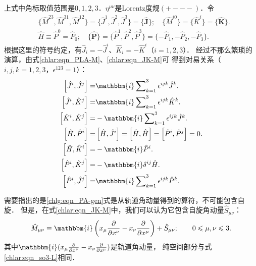 上式中角标取值范围是$0,1,2,3$．$\eta^{\mu \nu}$是Lorentz度规$(+---)$．令
\begin{equation}\label{chlar:eqn_JK-M}
	\begin{aligned}
		&\{\hat{M}^{23},\hat{M}^{31},\hat{M}^{12}\}= \{\hat{J}^1, \hat{J}^2, \hat{J}^3\}=\{\hat{\boldsymbol{J}}\};
		\quad \{\hat{M}^{i0}\}= \{\hat{K}^i\}=\{\hat{\boldsymbol{K}}\}. \\
		& \hat{H}\equiv \hat{P}^0 = \hat{P}_0;\quad 
		\{\hat{\boldsymbol{P}}\}=\{\hat{P}^1,\hat{P}^2,\hat{P}^3\} =\{-\hat{P}_1,-\hat{P}_2,-\hat{P}_3\}.
	\end{aligned}
\end{equation}
根据这里的符号约定，有$\hat{J}_i=-\hat{J}^i$、$\hat{K}_i=-\hat{K}^i$（$i=1,2,3$）．
经过不那么繁琐的演算，由式\eqref{chlar:eqn_PLA-M}、\eqref{chlar:eqn_JK-M}可
得到对易关系（$i,j,k=1,2,3$，$\epsilon^{123}=1$）：
\begin{subequations}\label{chlar:eqn_PA-iso13-comm-PJK}
	\begin{align}
		\left[\hat{J}^i, \hat{J}^j \right] =& \mathbbm{i} \sum\nolimits_{k=1}^{3} \epsilon^{ijk} \hat{J}^k . \\
		\left[\hat{J}^i, \hat{K}^j\right] =& \mathbbm{i} \sum\nolimits_{k=1}^{3} \epsilon^{ijk} \hat{K}^k . \\
		\left[\hat{K}^i, \hat{K}^j\right] =& -\mathbbm{i}\sum\nolimits_{k=1}^{3} \epsilon^{ijk} \hat{J}^k . \\
		\left[\hat{H}, \hat{P}^i \right] =& \left[\hat{H}, \hat{J}^i \right]
		=\left[\hat{H}, \hat{H} \right] =\left[\hat{P}^i, \hat{P}^j \right] =0 . \\
		\left[\hat{H}, \hat{K}^i \right] = & -\mathbbm{i} \hat{P}^i .\\
		\left[\hat{P}^i, \hat{K}^j \right] =& -\mathbbm{i} \delta^{ij} \hat{H} . \\
		\left[\hat{P}^i, \hat{J}^j \right] =& \mathbbm{i} \sum\nolimits_{k=1}^{3} \epsilon^{ijk} \hat{P}^k .
	\end{align}
\end{subequations}

需要指出的是\eqref{chlg:eqn_PA-gen}式是从轨道角动量得到的算符，不可能包含自旋．
但是，在式\eqref{chlar:eqn_JK-M}中，我们可以认为它包含自旋角动量$\hat{S}_{\mu\nu}$：
\begin{equation}
	\hat{M}_{\mu\nu}\equiv  \mathbbm{i} \left(
	x_\mu \frac{\partial}{\partial x^\nu}
	-x_\nu \frac{\partial}{\partial x^\mu}\right) + \hat{S}_{\mu\nu};
	\qquad  0\leqslant \mu,\nu \leqslant 3 .
\end{equation}
其中$ \mathbbm{i} (x_\mu \frac{\partial}{\partial x^\nu}
-x_\nu \frac{\partial}{\partial x^\mu})$是轨道角动量，
纯空间部分与式\eqref{chlar:eqn_so3-L}相同．



